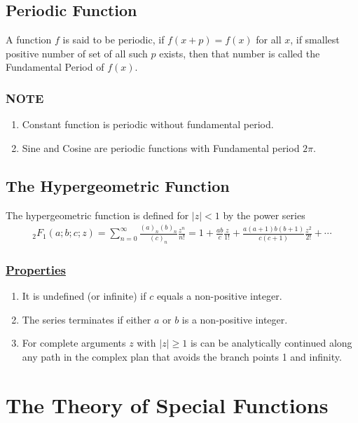 \documentclass[11pt]{report}
\newcommand{\ubt}[1]{\textbf{\underline{#1}}}
\newcommand{\properties}{\subsubsection{\ubt{Properties}}}
\renewcommand{\labelenumi}{\roman{enumi}.}
\begin{document}
	\subsection{Periodic Function}
	A function $f$ is said to be periodic, if $f(x+p)=f(x)$ for all $x$, if smallest positive number of set of all such $p$ exists, then that number is called the Fundamental Period of $f(x)$.
	
	\subsubsection{NOTE}
	\begin{enumerate}
		\renewcommand{\labelenumi}{\roman{enumi}.}
		\item Constant function is periodic without fundamental period.
		
		\item Sine and Cosine are  periodic functions with Fundamental period $2\pi$.
	\end{enumerate}
	
	\subsection{The Hypergeometric Function}
	The hypergeometric function is defined for $|z| < 1$ by the power series
	\begin{eqnarray}
		{}_2F_1(a;b;c;z) = \sum_{n=0}^{\infty} \frac{(a)_n(b)_n}{(c)_n}\frac{z^n}{n!} = 1 + \frac{ab}{c}\frac{z}{1!} + \frac{a(a+1)b(b+1)}{c(c+1)}\frac{z^2}{2!}+ \cdots\label{eq:2_11}
	\end{eqnarray}
	
	\properties
	\begin{enumerate}
		\renewcommand{\labelenumi}{\roman{enumi}.}
		\item It is undefined (or infinite) if $c$ equals a non-positive integer.
		
		\item The series terminates if either $a$ or $b$ is a non-positive integer.
		
		\item For complete arguments $z$ with $|z|\geq 1$ is can be analytically continued along any path in the complex plan that avoids the branch points 1 and infinity.
	\end{enumerate}

	
	\section{The Theory of Special Functions}
	
\end{document}
